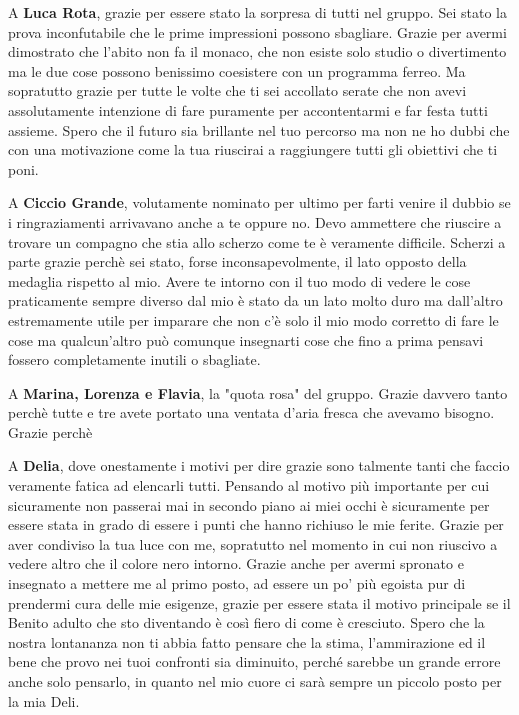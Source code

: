 \documentclass[cucitura%
,12pt%
]{toptesi}
\begin{document}
A \textbf{Luca Rota}, grazie per essere stato la sorpresa di tutti nel gruppo. Sei stato la prova inconfutabile che le prime impressioni possono sbagliare. Grazie per avermi dimostrato che l'abito non fa il monaco, che non esiste solo studio o divertimento ma le due cose possono benissimo coesistere con un programma ferreo. Ma sopratutto
grazie per tutte le volte che ti sei accollato serate che non avevi assolutamente intenzione di fare puramente per accontentarmi e far festa tutti assieme. Spero che il futuro sia brillante nel tuo percorso ma non ne ho dubbi che con una motivazione come la tua riuscirai a raggiungere tutti gli obiettivi che ti poni.

A \textbf{Ciccio Grande}, volutamente nominato per ultimo per farti venire il dubbio se i ringraziamenti arrivavano anche a te oppure no. Devo ammettere che riuscire a trovare un compagno che stia allo scherzo come te è veramente difficile. Scherzi a parte grazie perchè sei stato, forse inconsapevolmente, il lato opposto della medaglia rispetto al mio.
Avere te intorno con il tuo modo di vedere le cose praticamente sempre diverso dal mio è stato da un lato molto duro ma dall'altro estremamente utile per imparare che non c'è solo il mio modo corretto di fare le cose ma qualcun'altro può comunque insegnarti cose che fino a prima pensavi fossero completamente inutili o sbagliate. 

A \textbf{Marina, Lorenza e Flavia}, la "quota rosa" del gruppo. Grazie davvero tanto perchè tutte e tre avete portato una ventata d'aria fresca che avevamo bisogno. Grazie perchè 

A \textbf{Delia}, dove onestamente i motivi per dire grazie sono talmente tanti che faccio veramente fatica ad elencarli tutti. Pensando al motivo più importante per cui sicuramente non passerai mai in secondo piano ai miei occhi è 
sicuramente per essere stata in grado di essere i punti che hanno richiuso le mie ferite. Grazie per aver condiviso la tua luce con me, sopratutto nel momento in cui non riuscivo a vedere altro che il colore nero intorno. 
Grazie anche per avermi spronato e insegnato a mettere me al primo posto, ad essere un po’ più egoista pur di prendermi cura delle mie esigenze, grazie per essere stata il motivo principale se il Benito adulto che sto diventando è così fiero di come è cresciuto. 
Spero che la nostra lontananza non ti abbia fatto pensare che la stima, l’ammirazione ed il bene che provo nei tuoi confronti sia diminuito, perché sarebbe un grande errore anche solo pensarlo, in quanto nel mio cuore ci sarà sempre un piccolo posto per la mia Deli.
\end{document}
